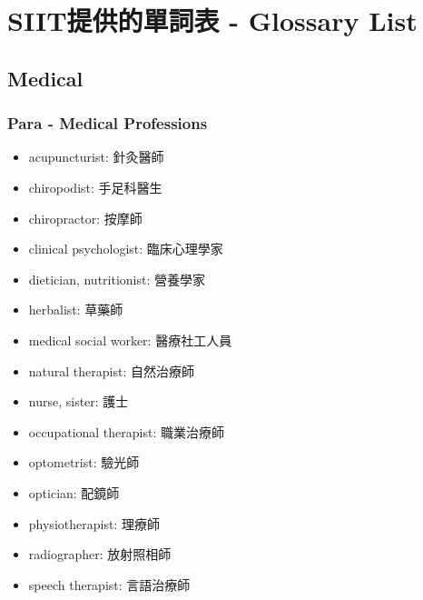 \chapter{SIIT提供的單詞表 - Glossary List}
\section{Medical}
\subsection{Para - Medical Professions}
\begin{multicols}{2}
\begin{itemize}
  \itemsep0em
  \item acupuncturist: 針灸醫師
  \item chiropodist: 手足科醫生
  \item chiropractor: 按摩師
  \item clinical psychologist: 臨床心理學家
  \item dietician, nutritionist: 營養學家
  \item herbalist: 草藥師
  \item medical social worker: 醫療社工人員
  \item natural therapist: 自然治療師
  \item nurse, sister: 護士
  \item occupational therapist: 職業治療師
  \item optometrist: 驗光師
  \item optician: 配鏡師
  \item physiotherapist: 理療師
  \item radiographer: 放射照相師
  \item speech therapist: 言語治療師
\end{itemize}
\end{multicols}

